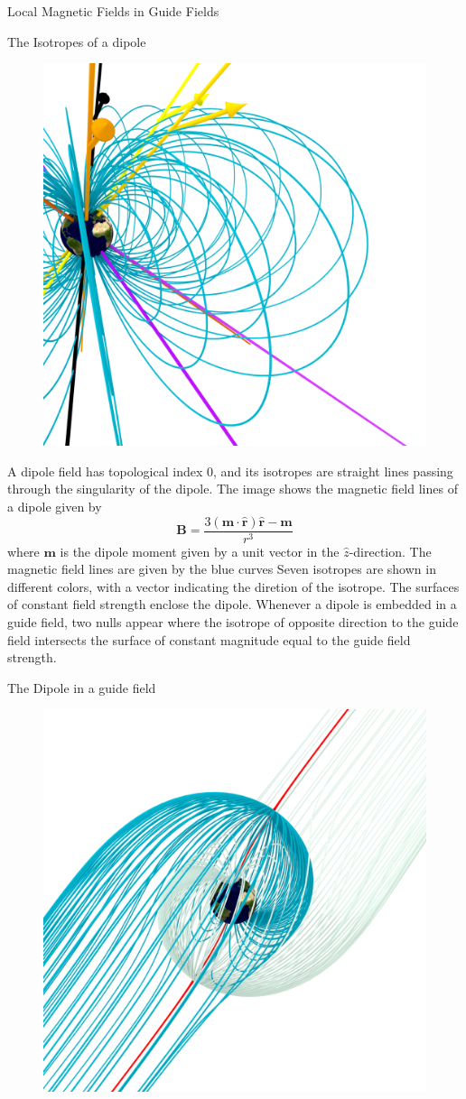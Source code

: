 \documentclass[final]{beamer}
\newlength{\onecolwid}
\begin{document}
\begin{frame}[t]
\begin{columns}[t]
\begin{column}{\onecolwid}
\begin{block}{\huge{Local Magnetic Fields in Guide Fields}}
\begin{block}{The Isotropes of a dipole}
    \begin{figure}
      \includegraphics[width=.5\textwidth]{fig/mainfig.png}
    \end{figure}
    A dipole field has topological index 0, and its isotropes are straight lines passing through
    the singularity of the dipole.
    The image shows the magnetic field lines of a dipole given by
    \begin{equation}
      \mathbf{B} = \frac{3(\mathbf{m}\cdot\hat{\mathbf{r}})\hat{\mathbf{r}}-\mathbf{m}}
      {r^3}
    \end{equation}
    where $\mathbf{m}$ is the dipole moment given by a unit vector in the
    $\hat{z}$-direction. 
    The magnetic field lines are given by the blue curves
    Seven isotropes are shown in different colors, with a vector indicating the diretion of the
    isotrope.
    The surfaces of constant field strength enclose the dipole. 
    Whenever a dipole is embedded in a guide field, two nulls appear where the isotrope of
    opposite direction to the guide field intersects the surface of constant magnitude
    equal to the guide field strength. 
\end{block}

\begin{block}{The Dipole in a guide field}
    \begin{figure}
    \includegraphics[width=.5\textwidth]{fig/separatrix_dipole.png}
    \end{figure}


\end{block}
\end{block}
\end{column}
\end{columns}
\end{frame}
\end{document}
